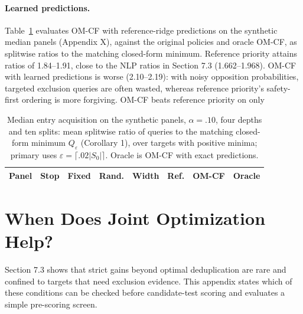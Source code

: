 \documentclass[11pt]{article}
\newcommand{\Sz}{S_0}
\begin{document}
\paragraph{Learned predictions.} Table~\ref{tab:omcf} evaluates OM-CF with reference-ridge predictions on the synthetic median panels (Appendix X), against the original policies and oracle OM-CF, as splitwise ratios to the matching closed-form minimum. Reference priority attains ratios of 1.84--1.91, close to the NLP ratios in Section 7.3 (1.662--1.968). OM-CF with learned predictions is worse (2.10--2.19): with noisy opposition probabilities, targeted exclusion queries are often wasted, whereas reference priority's safety-first ordering is more forgiving. OM-CF beats reference priority on only %

\begin{table}[t]
\centering\footnotesize
\setlength{\tabcolsep}{1.5pt}
\begin{tabular}{@{}ll rrrrrr@{}}
\toprule
Panel & Stop & Fixed & Rand. & Width & Ref. & OM-CF & Oracle\\
\midrule
\bottomrule
\end{tabular}
\caption{Median entry acquisition on the synthetic panels, $\alpha=.10$, four depths and ten splits: mean splitwise ratio of queries to the matching closed-form minimum $Q_\varepsilon$ (Corollary 1), over targets with positive minima; primary uses $\varepsilon=\lceil.02|\Sz|\rceil$. Oracle is OM-CF with exact predictions.}
\label{tab:omcf}
\end{table}

\section{When Does Joint Optimization Help?}
\label{app:predict}
Section 7.3 shows that strict gains beyond optimal deduplication are rare and confined to targets that need exclusion evidence. This appendix states which of these conditions can be checked before candidate-test scoring and evaluates a simple pre-scoring screen.
\end{document}
